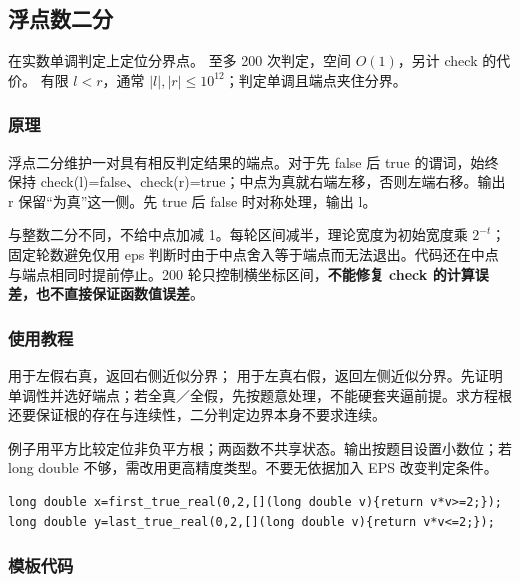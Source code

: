 \subsection{浮点数二分}
\label{other:binary-real}
\AlgorithmInfo
    {在实数单调判定上定位分界点。}
    {至多 200 次判定，空间 $O(1)$，另计 check 的代价。}
    {有限 $l<r$，通常 $|l|,|r|\le10^{12}$；判定单调且端点夹住分界。}
\subsubsection*{原理}
浮点二分维护一对具有相反判定结果的端点。对于先 false 后 true 的谓词，始终保持 check(l)=false、check(r)=true；中点为真就右端左移，否则左端右移。输出 r 保留“为真”这一侧。先 true 后 false 时对称处理，输出 l。

与整数二分不同，不给中点加减 1。每轮区间减半，理论宽度为初始宽度乘 $2^{-t}$；固定轮数避免仅用 eps 判断时由于中点舍入等于端点而无法退出。代码还在中点与端点相同时提前停止。200 轮只控制横坐标区间，\textbf{不能修复 check 的计算误差，也不直接保证函数值误差}。
\subsubsection*{使用教程}
 用于左假右真，返回右侧近似分界； 用于左真右假，返回左侧近似分界。先证明单调性并选好端点；若全真／全假，先按题意处理，不能硬套夹逼前提。求方程根还要保证根的存在与连续性，二分判定边界本身不要求连续。

例子用平方比较定位非负平方根；两函数不共享状态。输出按题目设置小数位；若 long double 不够，需改用更高精度类型。不要无依据加入 EPS 改变判定条件。
\begin{lstlisting}[style=mtycpp,numbers=none]
long double x=first_true_real(0,2,[](long double v){return v*v>=2;});
long double y=last_true_real(0,2,[](long double v){return v*v<=2;});
\end{lstlisting}
\subsubsection*{模板代码}
